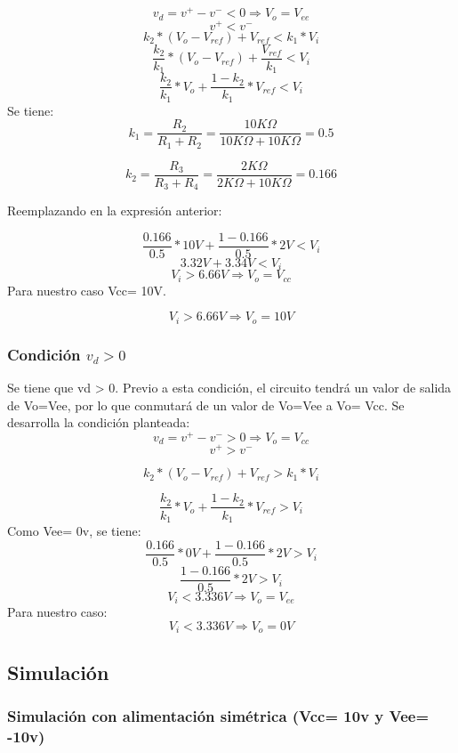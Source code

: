 \[v_d = v^+ - v^- < 0 \Rightarrow V_o = V_{ee}\]
\[v^+ < v^- \]
\[k_2 * (V_o - V_{ref}) + V_{ref} < k_1 * V_i\]
\[\frac{k_2}{k_1} * (V_o - V_{ref}) + \frac{V_{ref}}{k_1} < V_i \]
\[\frac{k_2}{k_1} * V_o + \frac{1 - k_2}{k_1} * V_{ref} < V_i \]
Se tiene:
\[ k_1 = \frac{R_2}{R_1 + R_2} = \frac{10K\Omega}{10K\Omega + 10K\Omega} = 0.5\]

\[ k_2 = \frac{R_3}{R_3 + R_4} = \frac{2K\Omega}{2K\Omega + 10K\Omega} = 0.166\]

Reemplazando en la expresión anterior:

\[\frac{0.166}{0.5} * 10V + \frac{1 - 0.166}{0.5} * 2V < V_i \]
\[3.32V + 3.34V < V_i \]
\[V_i > 6.66V \Rightarrow V_o = V_{cc}\]
Para nuestro caso Vcc= 10V.

\[V_i > 6.66V \Rightarrow V_o = 10V\]

\subsubsection{Condición \texorpdfstring{$v_d > 0$}{vd > 0}}
Se tiene que vd > 0. Previo a esta condición, el circuito tendrá un valor de salida de Vo=Vee, por lo que conmutará de un valor de Vo=Vee a Vo= Vcc. Se desarrolla la condición planteada:
\[v_d = v^+ - v^- > 0 \Rightarrow V_o = V_{cc}\]
\[v^+ > v^-\]

\[ k_2 * (V_o - V_{ref}) + V_{ref} > k_1 * V_i\]

\[\frac{k_2}{k_1} * V_o + \frac{1 - k_2}{k_1} * V_{ref} > V_i \]
Como Vee= 0v, se tiene:
\[\frac{0.166}{0.5} * 0V + \frac{1 - 0.166}{0.5} * 2V > V_i \]
\[\frac{1 - 0.166}{0.5} * 2V > V_i \]
\[V_i < 3.336V \Rightarrow V_o = V_{ee}\]
Para nuestro caso:
\[V_i < 3.336V \Rightarrow V_o = 0V\]

\subsection{Simulación}

\subsubsection{Simulación con alimentación simétrica (Vcc= 10v y Vee= -10v)}

